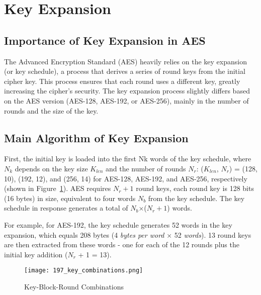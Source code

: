 \section{Key Expansion}

\subsection{Importance of Key Expansion in AES} 

The Advanced Encryption Standard (AES) heavily relies on the key expansion (or key schedule), 
a process that derives a series of round keys from the initial cipher key. 
This process ensures that each round uses a different key, 
greatly increasing the cipher's security. The key expansion process slightly differs 
based on the AES version (AES-128, AES-192, or AES-256), mainly in the number of rounds 
and the size of the key.

\subsection{Main Algorithm of Key Expansion}

First, the initial key is loaded into the first Nk words of the key schedule, where $N_k$ depends 
on the key size $K_{len}$ and the number of rounds $N_r$: ($K_{len}$, $N_r$) = (128, 10), (192, 12), and (256, 14) 
for AES-128, AES-192, and AES-256, respectively \cite{Key_Collisions} (shown in Figure~\ref{fig:key_comb}). AES requires $N_r+1$ round keys, each round key is 
128 bits (16 bytes) in size, equivalent to four words $N_b$ from the key schedule. The key schedule in 
response generates a total of $N_b$×($N_r+1$) words\cite{Standards2001}. \newline

For example, for AES-192, the key schedule generates 52 words in the key expansion, which equals 208 bytes (4 \textit{bytes per word} × 52 \textit{words}).
13 round keys are then extracted from these words - one for each of the 12 rounds plus the initial key addition ($N_r$ + 1 = 13).

\begin{figure}[h] %
    \centering
    \texttt{[image: 197\_key\_combinations.png]} %
    \caption{
        Key-Block-Round Combinations \cite{Standards2001}
    }
    \label{fig:key_comb} %
\end{figure}

